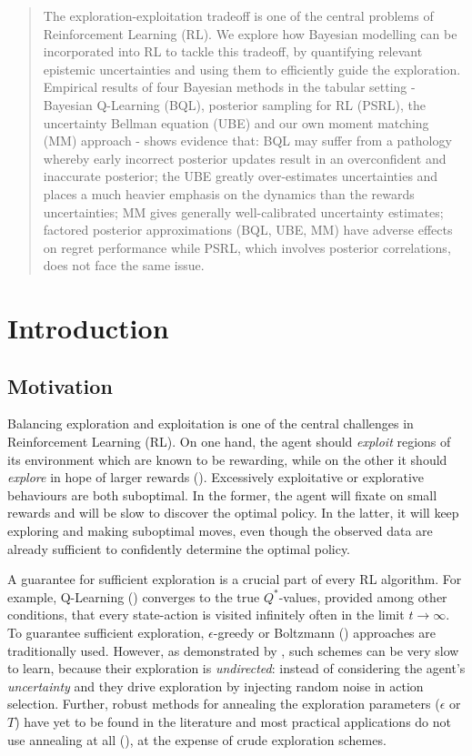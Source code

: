 \documentclass{article}
\begin{document}
\begin{abstract}
The exploration-exploitation tradeoff is one of the central problems of Reinforcement Learning (RL). We explore how Bayesian modelling can be incorporated into RL to tackle this tradeoff, by quantifying relevant epistemic uncertainties and using them to efficiently guide the exploration. Empirical results of four Bayesian methods in the tabular setting - Bayesian Q-Learning (BQL), posterior sampling for RL (PSRL), the uncertainty Bellman equation (UBE) and our own moment matching (MM) approach - shows evidence that: BQL may suffer from a pathology whereby early incorrect posterior updates result in an overconfident and inaccurate posterior; the UBE greatly over-estimates uncertainties and places a much heavier emphasis on the dynamics than the rewards uncertainties; MM gives generally well-calibrated uncertainty estimates; factored posterior approximations (BQL, UBE, MM) have adverse effects on regret performance while PSRL, which involves posterior correlations, does not face the same issue.
\end{abstract}

\section{Introduction}

\subsection{Motivation}

Balancing exploration and exploitation is one of the central challenges in Reinforcement Learning (RL). On one hand, the agent should \textit{exploit} regions of its environment which are known to be rewarding, while on the other it should \textit{explore} in hope of larger rewards (\cite{suttonbarto}). Excessively exploitative or explorative behaviours are both suboptimal. In the former, the agent will fixate on small rewards and will be slow to discover the optimal policy. In the latter, it will keep exploring and making suboptimal moves, even though the observed data are already sufficient to confidently determine the optimal policy.

A guarantee for sufficient exploration is a crucial part of every RL algorithm. For example, Q-Learning (\cite{qlearning}) converges to the true $Q^*$-values, provided among other conditions, that every state-action is visited infinitely often in the limit $t \to \infty$. To guarantee sufficient exploration, $\epsilon$-greedy or Boltzmann (\cite{suttonbarto}) approaches are traditionally used. However, as demonstrated by \cite{iothesis}, such schemes can be very slow to learn, because their exploration is \textit{undirected}: instead of considering the agent's \textit{uncertainty} and they drive exploration by injecting random noise in action selection. Further, robust methods for annealing the exploration parameters ($\epsilon$ or $T$) have yet to be found in the literature and most practical applications do not use annealing at all (\cite{mnihatari}), at the expense of crude exploration schemes.
\end{document}
